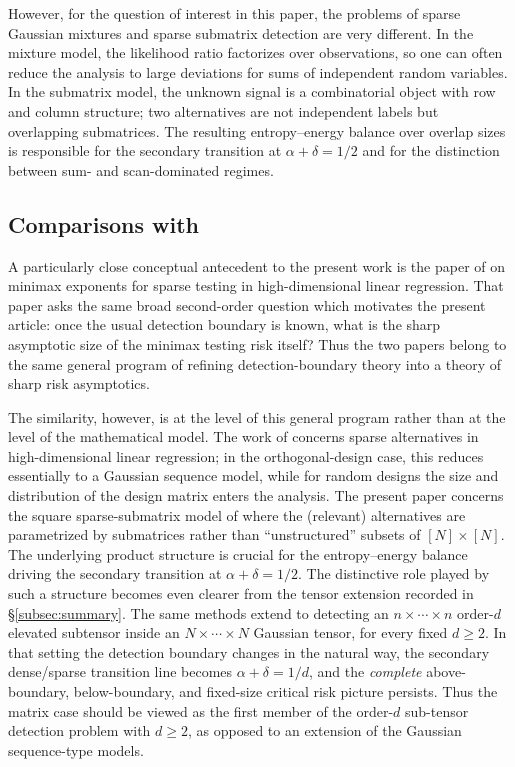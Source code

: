 \documentclass[11pt,reqno,letterpaper]{amsart}
\numberwithin{equation}{section}
\theoremstyle{plain}
\begin{document}
However, for the question of interest in this paper, the problems of sparse Gaussian mixtures and sparse submatrix detection are very different.  In the mixture model, the likelihood ratio factorizes over observations, so one can often reduce the analysis to large deviations for sums of independent random variables. In the submatrix model, the unknown signal is a combinatorial object with row and column structure; two alternatives are not independent labels but overlapping submatrices. The resulting entropy--energy balance over overlap sizes is responsible for the secondary transition at $\alpha + \delta = 1/2$ and for the distinction between sum- and scan-dominated regimes.

\subsection{Comparisons with \cite{mukherjee2020minimax}}
A particularly close conceptual antecedent to the present work is the paper of
\cite{mukherjee2020minimax} on minimax exponents for sparse testing in
high-dimensional linear regression.  That paper asks the same broad
second-order question which motivates the present article: once the usual
detection boundary is known, what is the sharp asymptotic size of the minimax
testing risk itself?  Thus the two papers belong to the same general program of refining
detection-boundary theory into a theory of sharp risk asymptotics.

The similarity, however, is at the level of this general program rather than at
the level of the mathematical model.  The work of \cite{mukherjee2020minimax}
concerns sparse alternatives in high-dimensional linear regression; in the
orthogonal-design case, this reduces essentially to a Gaussian sequence model,
while for random designs the size and distribution of the design matrix enters the analysis.
The present paper concerns the square sparse-submatrix model of 
\cite{butuceasubmatrix2013} where the (relevant) alternatives are parametrized by submatrices rather than ``unstructured'' subsets of $[N] \times [N]$. The underlying product structure is crucial for the entropy--energy balance driving the secondary 
transition at $\alpha+\delta=1/2$. The distinctive role played by such a structure becomes 
even clearer from the tensor extension recorded in \S\ref{subsec:summary}.  The same 
methods extend to detecting an $n\times\cdots\times n$ order-$d$ elevated subtensor 
inside an $N\times\cdots\times N$ Gaussian tensor, for every fixed $d\ge2$.  In that
setting the detection boundary changes in the natural way, the secondary
dense/sparse transition line becomes $\alpha+\delta=1/d$, and the {\em complete}
above-boundary, below-boundary, and fixed-size critical risk picture persists. %
Thus the matrix case should be viewed as the 
first member of the order-$d$ sub-tensor detection problem with $d \ge 2$, as opposed to 
an extension of the Gaussian sequence-type models. 
\end{document}
